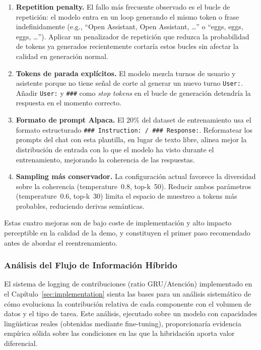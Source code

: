 \begin{enumerate}
    \item \textbf{Repetition penalty.} El fallo más frecuente observado es el bucle de repetición: el modelo entra en un loop generando el mismo token o frase indefinidamente (e.g., ``Open Assistant, Open Assistant, \ldots'' o ``eggs, eggs, eggs, \ldots''). Aplicar un penalizador de repetición que reduzca la probabilidad de tokens ya generados recientemente cortaría estos bucles sin afectar la calidad en generación normal.

    \item \textbf{Tokens de parada explícitos.} El modelo mezcla turnos de usuario y asistente porque no tiene señal de corte al generar un nuevo turno \texttt{User:}. Añadir \texttt{User:} y \texttt{\#\#\#} como \textit{stop tokens} en el bucle de generación detendría la respuesta en el momento correcto.

    \item \textbf{Formato de prompt Alpaca.} El 20\% del dataset de entrenamiento usa el formato estructurado \texttt{\#\#\# Instruction: / \#\#\# Response:}. Reformatear los prompts del chat con esta plantilla, en lugar de texto libre, alinea mejor la distribución de entrada con lo que el modelo ha visto durante el entrenamiento, mejorando la coherencia de las respuestas.

    \item \textbf{Sampling más conservador.} La configuración actual favorece la diversidad sobre la coherencia (temperature~0.8, top-k~50). Reducir ambos parámetros (temperature~0.6, top-k~30) limita el espacio de muestreo a tokens más probables, reduciendo derivas semánticas.
\end{enumerate}

Estas cuatro mejoras son de bajo coste de implementación y alto impacto perceptible en la calidad de la demo, y constituyen el primer paso recomendado antes de abordar el reentrenamiento.

\subsubsection{Análisis del Flujo de Información Híbrido}

El sistema de logging de contribuciones (ratio GRU/Atención) implementado en el Capítulo~\ref{sec:implementation} sienta las bases para un análisis sistemático de cómo evoluciona la contribución relativa de cada componente con el volumen de datos y el tipo de tarea. Este análisis, ejecutado sobre un modelo con capacidades lingüísticas reales (obtenidas mediante fine-tuning), proporcionaría evidencia empírica sólida sobre las condiciones en las que la hibridación aporta valor diferencial.

